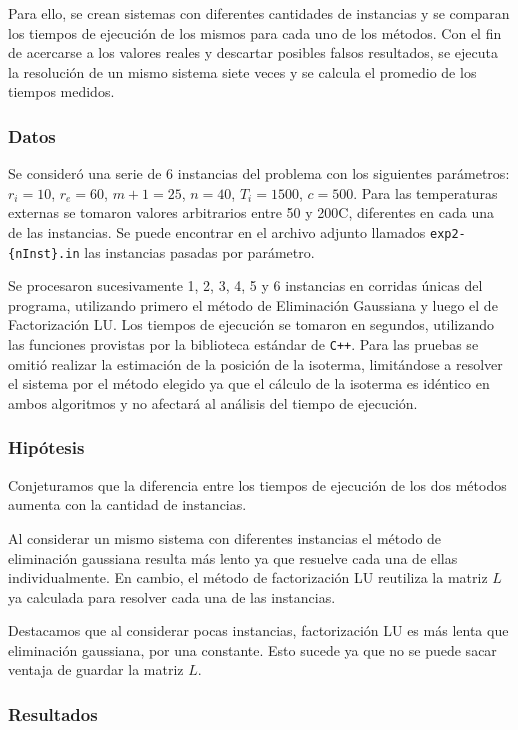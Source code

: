         Para ello, se crean sistemas con diferentes cantidades de instancias y se comparan los tiempos de ejecución de los mismos para cada uno de los métodos. Con el fin de acercarse a los valores reales y descartar posibles falsos resultados, se ejecuta la resolución de un mismo sistema siete veces y se calcula el promedio de los tiempos medidos. 

      \subsubsection*{Datos}
        Se consideró una serie de 6 instancias del problema con los siguientes parámetros: $r_i = 10$, $r_e = 60$, $m+1 = 25$, $n = 40$, $T_i = 1500$, $c = 500$. Para las temperaturas externas se tomaron valores arbitrarios entre 50 y 200{\degree}C, diferentes en cada una de las instancias. Se puede encontrar en el archivo adjunto llamados \texttt{exp2-\{nInst\}.in} las instancias pasadas por parámetro.
  
        Se procesaron sucesivamente 1, 2, 3, 4, 5 y 6 instancias en corridas únicas del programa, utilizando primero el método de Eliminación Gaussiana y luego el de Factorización LU. Los tiempos de ejecución se tomaron en segundos, utilizando las funciones provistas por la biblioteca estándar de \texttt{C++}. Para las pruebas se omitió realizar la estimación de la posición de la isoterma, limitándose a resolver el sistema por el método elegido ya que el cálculo de la isoterma es idéntico en ambos algoritmos y no afectará al análisis del tiempo de ejecución. 

      \subsubsection*{Hipótesis}
        Conjeturamos que la diferencia entre los tiempos de ejecución de los dos métodos aumenta con la cantidad de instancias. 

        Al considerar un mismo sistema con diferentes instancias el método de eliminación gaussiana resulta más lento ya que resuelve cada una de ellas individualmente. En cambio, el método de factorización LU reutiliza la matriz $L$ ya calculada para resolver cada una de las instancias. 

        Destacamos que al considerar pocas instancias, factorización LU es más lenta que eliminación gaussiana, por una constante. Esto sucede ya que no se puede sacar ventaja de guardar la matriz $L$. 

      \subsubsection*{Resultados}
        
